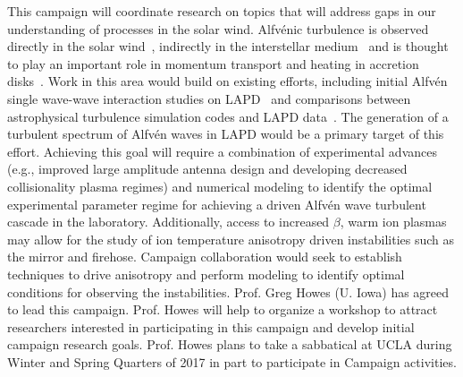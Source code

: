 \documentclass[11pt]{article}
\renewcommand{\cite}{\citep}
\begin{document}
 This campaign will
  coordinate research on topics that will address gaps in our
  understanding of processes in the solar wind.  Alfv\'{e}nic
  turbulence is observed directly in the solar wind~\cite{bale05,alexandrova08},
  indirectly in the interstellar medium~\cite{armstrong95} and is thought to play
  an important role in momentum transport and heating in accretion
  disks~\cite{balbus98}.  Work in this area would build on existing efforts,
  including initial Alfvén single wave-wave interaction studies on
  LAPD~\cite{carter:2006,auerbach:2010,auerbach:2011,dorfman:2013,dorfman:2015} and comparisons between astrophysical
  turbulence simulation codes and LAPD data~\cite{nielson:2010,howes:2012,howes:2013}.  The generation
  of a turbulent spectrum of Alfv\'{e}n waves in LAPD would be a
  primary target of this effort.  Achieving this goal will require a
  combination of experimental advances (e.g., improved large amplitude
  antenna design and developing decreased collisionality plasma regimes) and
  numerical modeling to identify the optimal experimental parameter
  regime for achieving a driven Alfv\'{e}n wave turbulent cascade in
  the laboratory.  Additionally, access to increased $\beta$, warm ion
  plasmas may allow for the study of ion temperature anisotropy driven
  instabilities such as the mirror and firehose.  Campaign
  collaboration would seek to establish techniques to drive anisotropy
  and perform modeling to identify optimal conditions for observing
  the instabilities.  Prof. Greg Howes (U. Iowa) has agreed to
  lead this campaign.  Prof. Howes will help to organize a workshop to
  attract researchers interested in participating in this campaign and
  develop initial campaign research goals.  Prof. Howes plans to take
  a sabbatical at UCLA during Winter and Spring Quarters of 2017 in
  part to participate in Campaign activities.  
\end{document}
